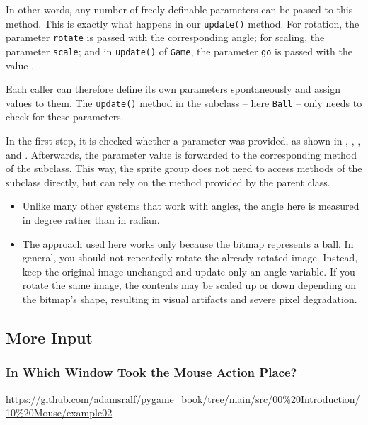 In other words, any number of freely definable parameters can be passed to this method. This is exactly what happens in our \texttt{update()} method. For rotation, the parameter \texttt{rotate} is passed with the corresponding angle; for scaling, the parameter \texttt{scale}; and in \texttt{update()} of \texttt{Game}, the parameter \texttt{go} is passed with the value \true. 
 
Each caller can therefore define its own parameters spontaneously and assign values to them. The \texttt{update()} method in the subclass -- here \texttt{Ball} -- only needs to check for these parameters.

In the first step, it is checked whether a parameter was provided, as shown in , , , and . Afterwards, the parameter value is forwarded to the corresponding method of the subclass. This way, the sprite group does not need to access methods of the subclass directly, but can rely on the method provided by the parent class.

\newpage
{} 

\begin{warningbox}
\begin{itemize}
	\item Unlike many other systems that work with angles, the angle here is measured in \gls{degree} rather than in \gls{radian}.
	\item The approach used here works only because the bitmap represents a ball. In general, you should not repeatedly rotate the already rotated image. Instead, keep the original image unchanged and update only an angle variable. If you rotate the same image, the contents may be scaled up or down depending on the bitmap’s shape, resulting in visual artifacts and severe pixel degradation.
\end{itemize}
\end{warningbox}

\subsection{More Input}
\subsubsection{In Which Window Took the Mouse Action Place?}
\begin{diskbox}
	\url{https://github.com/adamsralf/pygame_book/tree/main/src/00%20Introduction/10%20Mouse/example02}
\end{diskbox}

